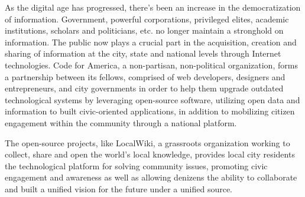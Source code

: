 
As the digital age has progressed, there's been an increase in the democratization of information. Government, powerful corporations, privileged elites, academic institutions, scholars and politicians, etc. no longer
maintain a stronghold on information. The public now plays a crucial part in the acquisition, creation and sharing of information at the city, state and 
national levels through Internet technologies. Code for America, a non-partisan, non-political organization, forms a partnership between its fellows, comprised of web developers, designers and entrepreneurs, and city governments in order to help them upgrade outdated technological systems by leveraging open-source software, utilizing open data and information to built civic-oriented applications, in addition to mobilizing citizen engagement within the community through a national platform. 

The open-source projects, like LocalWiki, a grassroots organization working to collect, share and open the world’s local knowledge, provides local city residents the technological platform for solving community issues, promoting civic engagement and awareness as well as allowing denizens the ability to collaborate and built a unified vision for the future under a unified source. 
